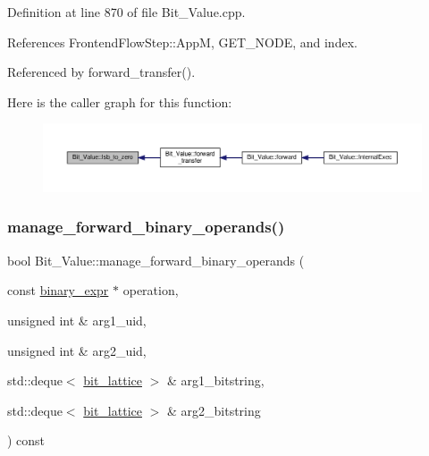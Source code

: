 Definition at line 870 of file Bit\+\_\+\+Value.\+cpp.



References Frontend\+Flow\+Step\+::\+AppM, G\+E\+T\+\_\+\+N\+O\+DE, and index.



Referenced by forward\+\_\+transfer().

Here is the caller graph for this function\+:
\nopagebreak
\begin{figure}[H]
\begin{center}
\leavevmode
\includegraphics[width=350pt]{df/d4b/classBit__Value_a71f649375c0d473c2f5b91ecc6c89365_icgraph}
\end{center}
\end{figure}
\mbox{\label{classBit__Value_a8d3cd62d0c1494696fa746657ad23a7e}} 
\subsubsection{\texorpdfstring{manage\+\_\+forward\+\_\+binary\+\_\+operands()}{manage\_forward\_binary\_operands()}}
{\footnotesize\ttfamily bool Bit\+\_\+\+Value\+::manage\+\_\+forward\+\_\+binary\+\_\+operands (\begin{DoxyParamCaption}\item[{const \hyperlink{structbinary__expr}{binary\+\_\+expr} $\ast$}]{operation,  }\item[{unsigned int \&}]{arg1\+\_\+uid,  }\item[{unsigned int \&}]{arg2\+\_\+uid,  }\item[{std\+::deque$<$ \hyperlink{bit__lattice_8hpp_ab732360111c810c4eaeb4c8b81d160d6}{bit\+\_\+lattice} $>$ \&}]{arg1\+\_\+bitstring,  }\item[{std\+::deque$<$ \hyperlink{bit__lattice_8hpp_ab732360111c810c4eaeb4c8b81d160d6}{bit\+\_\+lattice} $>$ \&}]{arg2\+\_\+bitstring }\end{DoxyParamCaption}) const\hspace{0.3cm}{\ttfamily [private]}}




